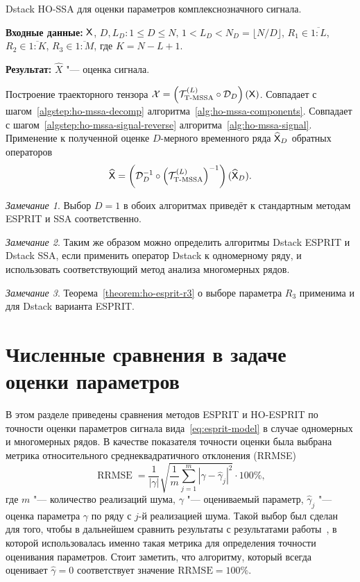 \documentclass[specialist,
  substylefile=spbu_report.rtx,
subf,href,colorlinks=true, 12pt]{disser}
\theoremstyle{plain}
\theoremstyle{definition}
\theoremstyle{remark}
\newtheorem{remark}{Замечание}[section]
\newcommand{\Input}{\textbf{Входные данные: }}
\newcommand{\Output}{\textbf{Результат: }}
\begin{document}
\begin{algorithm}[!ht]
  \caption{Dstack HO-SSA для оценки параметров комплекснозначного сигнала.}
  \label{alg:dstack-ho-ssa}
  \Input $\mathsf{X}$, $D, L_D: 1 \leqslant D \leqslant N,\, 1 < L_D < N_D =
  \lfloor N /
  D \rfloor$,
  $R_1 \in \overline{1:L}$, $R_2 \in \overline{1:K}$, $R_3 \in
  \overline{1:M}$, где $K = N-L+1$.

  \Output $\widehat{X}$ "--- оценка сигнала.
  \begin{algorithmic}[1]
    \State Построение траекторного тензора $\mathcal{X} =
    \left(\mathcal{T}_{\textrm{T-MSSA}}^{(L)} \circ \mathcal{D}_D\right) (\mathsf{X})$.
    \State Совпадает с шагом~\ref{algstep:ho-mssa-decomp}
    алгоритма~\ref{alg:ho-mssa-components}.
    \State Совпадает с шагом~\ref{algstep:ho-mssa-signal-reverse}
    алгоритма~\ref{alg:ho-mssa-signal}.
    \State Применение к полученной оценке $D$-мерного временного ряда
    $\widehat{\mathsf{X}}_D$ обратных операторов
    \[
      \widehat{\mathsf{X}} = \left(\mathcal{D}_D^{-1}
        \circ\left(\mathcal{T}_{\textrm{T-MSSA}}^{(L)}\right)^{-1}
      \right)(\widehat{\mathsf{X}}_D).
    \]
  \end{algorithmic}
\end{algorithm}
\begin{remark}
  Выбор $D=1$ в обоих алгоритмах приведёт к стандартным методам
  ESPRIT и SSA соответственно.
\end{remark}
\begin{remark}
  Таким же образом можно определить алгоритмы Dstack ESPRIT и Dstack SSA, если
  применить оператор Dstack к одномерному ряду, и использовать
  соответствующий метод
  анализа многомерных рядов.
\end{remark}
\begin{remark}
  Теорема~\ref{theorem:ho-esprit-r3} о выборе параметра $R_3$
  применима и для Dstack варианта ESPRIT.
\end{remark}

\section{Численные сравнения в задаче оценки
параметров}\label{sec:esprit-comparison}
В этом разделе приведены сравнения методов ESPRIT и HO-ESPRIT по
точности оценки параметров сигнала
вида~\eqref{eq:esprit-model} в случае одномерных и многомерных рядов.
В качестве показателя точности оценки была выбрана метрика
относительного среднеквадратичного
отклонения (RRMSE)
\begin{equation}
  \label{eq:rrmse}
  \operatorname{RRMSE} = \frac{1}{|\gamma|}\sqrt{\frac{1}{m}
  \sum_{j=1}^{m} \left|\gamma-\widehat{\gamma}_j\right|^2} \cdot 100\%,
\end{equation}
где $m$ "--- количество реализаций шума, $\gamma$ "--- оцениваемый
параметр, $\widehat{\gamma}_j$ "---
оценка параметра $\gamma$ по ряду с $j$-й реализацией шума.
Такой выбор был сделан для того, чтобы в дальнейшем сравнить
результаты с результатами
работы~\cite{hosvd-hooi-separation}, в которой использовалась именно
такая метрика для определения
точности оценивания параметров.
Стоит заметить, что алгоритму, который всегда оценивает
$\widehat{\gamma}=0$ соответствует значение $\text{RRMSE}=100\%$.
\end{document}
